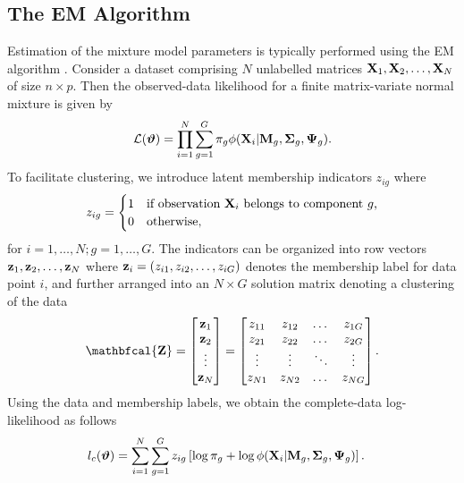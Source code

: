 \documentclass[12pt, centerh1]{article}
\begin{document}
\subsection{The EM Algorithm}
Estimation of the mixture model parameters is typically performed using the EM algorithm \citep{dempster1977}. Consider a dataset comprising $N$ unlabelled matrices ${\bf X}_1, {\bf X}_2, \dots, {\bf X}_N$ of size $n \times p$. Then the observed-data likelihood for a finite matrix-variate normal mixture is given by
\begin{equation*}
\mathcal{L}(\bm{\vartheta}) = \prod_{i=1}^N \sum_{g=1}^G\pi_g \phi({\bf X}_i | {\bf M}_g, {\bf \Sigma}_g, {\bf \Psi}_g).
\end{equation*} 
To facilitate clustering, we introduce latent membership indicators $z_{ig}$ where 
\begin{equation*}
z_{ig} = 
\begin{cases}
    1 & \text{if observation ${\bf X}_i$ belongs to component $g$,} \\
    0 & \text{otherwise},
    \end{cases}
\end{equation*} 
for $i= 1, \dots, N; g = 1, \dots, G$. The indicators can be organized into row vectors ${\bf z}_1, {\bf z}_2, \dots, {\bf z}_N$ where ${\bf z}_i = (z_{i1}, z_{i2}, \dots, z_{iG})$ denotes the membership label for data point $i$, and further arranged into an $N \times G$ solution matrix denoting a clustering of the data 
\begin{equation*}
{\bf \mathbfcal{Z}} = 
\begin{bmatrix}
{\bf z}_1 \\
{\bf z}_2 \\
\vdots \\
{\bf z}_N \\
 \end{bmatrix} 
 = 
 \begin{bmatrix}
    z_{11} & z_{12} & \dots & z_{1G} \\
    z_{21} & z_{22}& \dots & z_{2G}\\
    \vdots & \vdots & \ddots & \vdots \\
    z_{N1}& z_{N2}& \dots & z_{NG}\\
\end{bmatrix}.
\end{equation*}
Using the data and membership labels, we obtain the complete-data log-likelihood as follows
\begin{align*}
l_c(\bm{\vartheta}) &= \sum_{i=1}^N \sum_{g=1}^G z_{ig} \left[ \log \pi_g + \log \phi({\bf X}_i | {\bf M}_g, {\bf \Sigma}_g, {\bf \Psi}_g) \right].
\end{align*}
\end{document}
